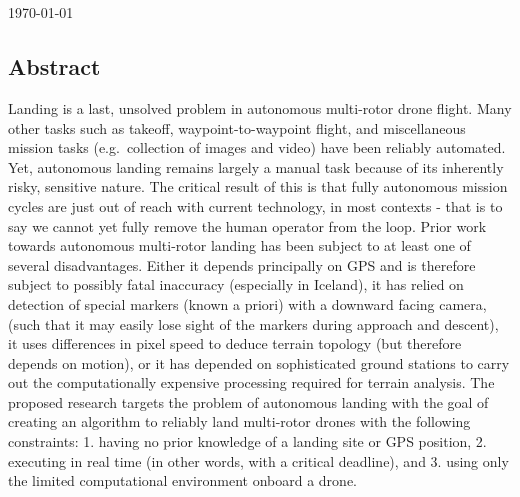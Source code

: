 \begin{center}
    \Large
    \textbf{\documenttitle}
    ~\\[0.5cm]
    \documentauthor
    ~\\[0.5cm]
    \specialdate\today
\end{center}

\subsection*{Abstract}

Landing is a last, unsolved problem in autonomous multi-rotor drone flight.
Many other tasks such as takeoff, waypoint-to-waypoint flight,
and miscellaneous mission tasks (e.g.~collection of images and video) have been reliably automated.
Yet, autonomous landing remains largely a manual task because of its inherently risky, sensitive nature.
The critical result of this is that fully autonomous mission cycles are just out of reach with current technology, in most contexts - that is to say we cannot yet fully remove the human operator from the loop.
Prior work towards autonomous multi-rotor landing has been subject to at least one of several disadvantages.
Either it depends principally on GPS and is therefore subject to possibly fatal inaccuracy (especially in Iceland),
it has relied on detection of special markers (known a priori) with a downward facing camera, (such that it may easily lose sight of the markers during approach and descent),
it uses differences in pixel speed to deduce terrain topology (but therefore depends on motion),
or it has depended on sophisticated ground stations to carry out the computationally expensive processing required for terrain analysis.
The proposed research targets the problem of autonomous landing with the goal of creating an algorithm to reliably land multi-rotor drones with the following constraints: 1. having no prior knowledge of a landing site or GPS position, 2. executing in real time (in other words, with a critical deadline), and 3. using only the limited computational environment onboard a drone.

